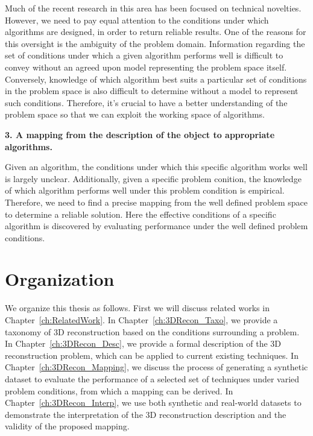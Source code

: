 Much of the recent research in this area has been focused on technical novelties. However, we need to pay equal attention to the conditions under which algorithms are designed, in order to return reliable results. One of the reasons for this oversight is the ambiguity of the problem domain. Information regarding the set of conditions under which a given algorithm performs well is difficult to convey without an agreed upon model representing the problem space itself. Conversely, knowledge of which algorithm best suits a particular set of conditions in the problem space is also difficult to determine without a model to represent such conditions. Therefore, it's crucial to have a better understanding of the problem space so that we can exploit the working space of algorithms.

\noindent\textbf{3. A mapping from the description of the object to appropriate algorithms.}

Given an algorithm, the conditions under which this specific algorithm works well is largely unclear. Additionally, given a specific problem conition, the knowledge of which algorithm performs well under this problem condition is empirical. Therefore, we need to find a precise mapping from the well defined problem space to determine a reliable solution. Here the effective conditions of a specific algorithm is discovered by evaluating performance under the well defined problem conditions.



\section{Organization}
We organize this thesis as follows. First we will discuss related works in Chapter~\ref{ch:RelatedWork}. In Chapter~\ref{ch:3DRecon_Taxo}, we provide a taxonomy of 3D reconstruction based on the conditions surrounding a problem. In Chapter~\ref{ch:3DRecon_Desc}, we provide a formal description of the 3D reconstruction problem, which can be applied to current existing techniques. In Chapter~\ref{ch:3DRecon_Mapping}, we discuss the process of generating a synthetic dataset to evaluate the performance of a selected set of techniques under varied problem conditions, from which a mapping can be derived. In Chapter~\ref{ch:3DRecon_Interp}, we use both synthetic and real-world datasets to demonstrate the interpretation of the 3D reconstruction description and the validity of the proposed mapping.